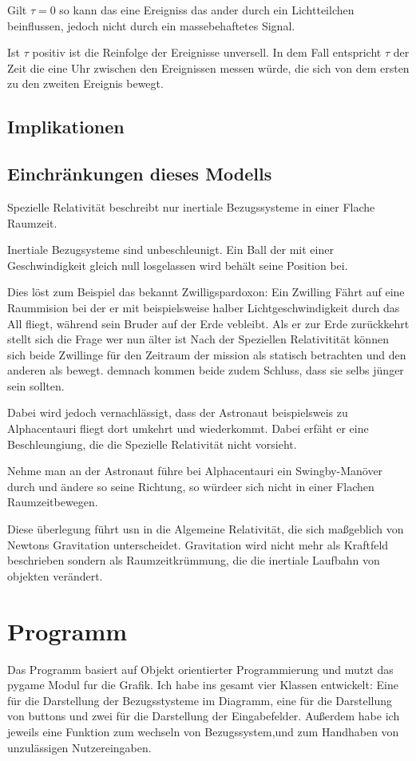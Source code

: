 \documentclass[12pt]{article}
\begin{document}
Gilt $\tau = 0$ so kann das eine Ereigniss das ander durch ein Lichtteilchen beinflussen, jedoch nicht durch ein massebehaftetes Signal.

Ist $\tau$ positiv ist die Reinfolge der Ereignisse unversell.
In dem Fall entspricht $\tau$ der Zeit die eine Uhr zwischen den Ereignissen messen würde, die sich von dem ersten zu den zweiten Ereignis bewegt.
\subsection{Implikationen}
\subsection{Einchränkungen dieses Modells}
Spezielle Relativität beschreibt nur inertiale Bezugssysteme in einer Flache Raumzeit.

Inertiale Bezugsysteme sind unbeschleunigt.
Ein Ball der mit einer Geschwindigkeit gleich null losgelassen wird behält seine Position bei.

Dies löst zum Beispiel das bekannt Zwilligspardoxon:
Ein Zwilling Fährt auf eine Raummision bei der er mit beispielsweise halber Lichtgeschwindigkeit durch das All fliegt, während sein Bruder auf der Erde vebleibt.
Als er zur Erde zurückkehrt stellt sich die Frage wer nun älter ist
Nach der Speziellen Relativitität können sich beide Zwillinge für den Zeitraum der mission als statisch betrachten und den anderen als bewegt.
demnach kommen beide zudem Schluss, dass sie selbs jünger sein sollten.

Dabei wird jedoch vernachlässigt, dass der Astronaut beispielsweis zu Alphacentauri fliegt dort umkehrt und wiederkommt.
Dabei erfäht er eine Beschleungiung, die die Spezielle Relativität nicht vorsieht.

Nehme man an der Astronaut führe bei Alphacentauri ein Swingby-Manöver durch und ändere so seine Richtung, so würdeer sich nicht in einer Flachen Raumzeitbewegen.

Diese überlegung führt usn in die Algemeine Relativität, die sich maßgeblich von Newtons Gravitation unterscheidet.
Gravitation wird nicht mehr als Kraftfeld beschrieben sondern als Raumzeitkrümmung, die die inertiale Laufbahn von objekten verändert.

\section{Programm}
Das Programm basiert auf Objekt orientierter Programmierung und mutzt das pygame Modul fur die Grafik.
Ich habe ins gesamt vier Klassen entwickelt:
Eine für die Darstellung der Bezugsstysteme im Diagramm, eine für die Darstellung von buttons und zwei für die Darstellung der Eingabefelder.
Außerdem habe ich jeweils eine Funktion zum wechseln von Bezugssystem,und zum Handhaben von unzulässigen Nutzereingaben.
\end{document}
